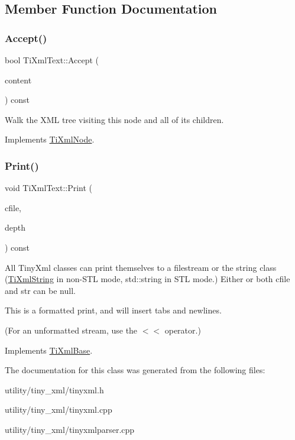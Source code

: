 \subsection{Member Function Documentation}
\hypertarget{class_ti_xml_text_af65964326eac4640bfb97d4622fa0de2}{}\label{class_ti_xml_text_af65964326eac4640bfb97d4622fa0de2} 
\subsubsection{\texorpdfstring{Accept()}{Accept()}}
{\footnotesize\ttfamily bool Ti\+Xml\+Text\+::\+Accept (\begin{DoxyParamCaption}\item[{\hyperlink{class_ti_xml_visitor}{Ti\+Xml\+Visitor} $\ast$}]{content }\end{DoxyParamCaption}) const\hspace{0.3cm}{\ttfamily [virtual]}}

Walk the X\+ML tree visiting this node and all of its children. 

Implements \hyperlink{class_ti_xml_node_acc0f88b7462c6cb73809d410a4f5bb86}{Ti\+Xml\+Node}.

\hypertarget{class_ti_xml_text_a75f6895906333894e2574cc8cf77ea79}{}\label{class_ti_xml_text_a75f6895906333894e2574cc8cf77ea79} 
\subsubsection{\texorpdfstring{Print()}{Print()}}
{\footnotesize\ttfamily void Ti\+Xml\+Text\+::\+Print (\begin{DoxyParamCaption}\item[{F\+I\+LE $\ast$}]{cfile,  }\item[{int}]{depth }\end{DoxyParamCaption}) const\hspace{0.3cm}{\ttfamily [virtual]}}

All Tiny\+Xml classes can print themselves to a filestream or the string class (\hyperlink{class_ti_xml_string}{Ti\+Xml\+String} in non-\/\+S\+TL mode, std\+::string in S\+TL mode.) Either or both cfile and str can be null.

This is a formatted print, and will insert tabs and newlines.

(For an unformatted stream, use the $<$$<$ operator.) 

Implements \hyperlink{class_ti_xml_base_a0de56b3f2ef14c65091a3b916437b512}{Ti\+Xml\+Base}.



The documentation for this class was generated from the following files\+:\begin{DoxyCompactItemize}
\item 
utility/tiny\+\_\+xml/tinyxml.\+h\item 
utility/tiny\+\_\+xml/tinyxml.\+cpp\item 
utility/tiny\+\_\+xml/tinyxmlparser.\+cpp\end{DoxyCompactItemize}
